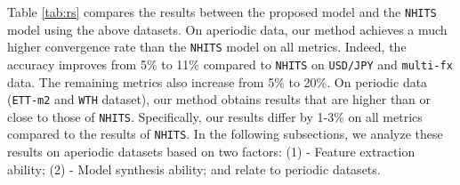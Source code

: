\documentclass[aps,prb,groupedaddress,twocolumn,showpacs,dvipdfmx,superscriptaddress,pdftex]{revtex4-2}
\begin{document}
Table \ref{tab:rs} compares the results between the proposed model and the \verb|NHITS| model using the above datasets. On aperiodic data, our method achieves a much higher convergence rate than the \verb|NHITS| model on all metrics. Indeed, the accuracy improves from 5\% to 11\% compared to \verb|NHITS| on \verb|USD/JPY| and \verb|multi-fx| data. The remaining metrics also increase from 5\% to 20\%. On periodic data (\verb|ETT-m2| and \verb|WTH| dataset), our method obtains results that are higher than or close to those of \verb|NHITS|. Specifically, our results differ by 1-3\% on all metrics compared to the results of \verb|NHITS|. In the following subsections, we analyze these results on aperiodic datasets based on two factors: (1) - Feature extraction ability; (2) - Model synthesis ability; and relate to periodic datasets.
\end{document}
